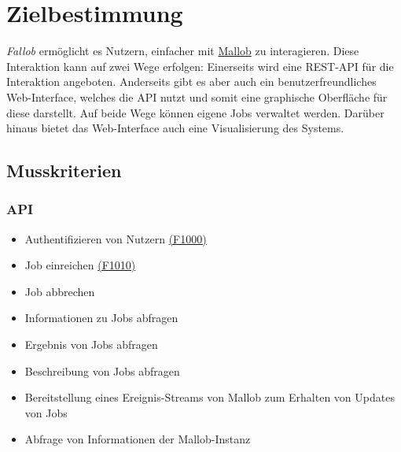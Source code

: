 \section{Zielbestimmung}
\textit{Fallob} ermöglicht es Nutzern, einfacher mit \href{https://github.com/domschrei/mallob}{Mallob} zu interagieren. Diese Interaktion kann auf zwei Wege erfolgen:
Einerseits wird eine REST-API für die Interaktion angeboten. Anderseits gibt es aber auch ein benutzerfreundliches Web-Interface, welches die API nutzt und somit eine graphische Oberfläche für diese darstellt. Auf beide Wege können eigene Jobs verwaltet werden. Darüber hinaus bietet das Web-Interface auch eine Visualisierung des Systems.


\subsection{Musskriterien}
    \subsubsection{API}
        \begin{itemize}[noitemsep]
            \item Authentifizieren von Nutzern \hyperref[FA:API:Authentifizieren von Nutzern]{(F1000)}
            \item Job einreichen \hyperref[FA:API:Einreichen von Jobs]{(F1010)}
            \item Job abbrechen
            \item Informationen zu Jobs abfragen
            \item Ergebnis von Jobs abfragen
            \item Beschreibung von Jobs abfragen
            \item Bereitstellung eines Ereignis-Streams von Mallob zum Erhalten von Updates von Jobs
            \item Abfrage von Informationen der Mallob-Instanz
        \end{itemize}
